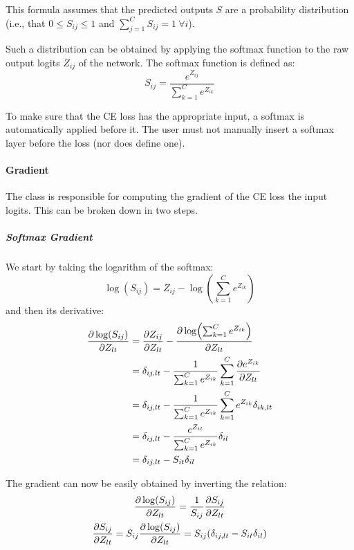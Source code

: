 This formula assumes that the predicted outputs $S$ are a probability distribution (i.e., that $0 \leq S_{ij} \leq 1$ and $\sum_{j=1}^{C} S_{ij} = 1\ \forall i$).

Such a distribution can be obtained by applying the softmax function to the raw output logits $Z_{ij}$ of the network. The softmax function is defined as:
\begin{equation}
    S_{ij} = \frac{e^{Z_{ij}}}{\sum_{k=1}^{C} e^{Z_{ik}}}
\end{equation}

To make sure that the \ac{CE} loss has the appropriate input, a softmax is automatically applied before it. The user must not manually insert a softmax layer before the loss (nor does \mfnet define one).

\paragraph{Gradient} The  class is responsible for computing the gradient of the \ac{CE} loss \wrt the input logits. This can be broken down in two steps.

\subparagraph{Softmax Gradient} We start by taking the logarithm of the softmax:
\begin{equation}
    \log(S_{ij}) = Z_{ij} - \log(\sum_{k=1}^{C} e^{Z_{ik}})
\end{equation}
and then its derivative:
\begin{equation} \label{eq:softmax_grad}
\begin{split}
    \pdv{\log(S_{ij})}{Z_{lt}} &= \pdv{Z_{ij}}{Z_{lt}} - \pdv{\log(\sum_{k=1}^{C} e^{Z_{ik}})}{Z_{lt}}\\
    &= \delta_{ij,lt} - \frac{1}{\sum_{k=1}^{C} e^{Z_{ik}}} \sum_{k=1}^{C} \pdv{e^{Z_{ik}}}{Z_{lt}}\\
    &= \delta_{ij,lt} - \frac{1}{\sum_{k=1}^{C} e^{Z_{ik}}} \sum_{k=1}^{C} e^{Z_{ik}} \delta_{ik,lt}\\
    &= \delta_{ij,lt} - \frac{e^{Z_{it}}}{\sum_{k=1}^{C} e^{Z_{ik}}} \delta_{il}\\
    &= \delta_{ij,lt} - S_{it} \delta_{il}
\end{split}
\end{equation}

The gradient can now be easily obtained by inverting the relation:
\begin{gather}
    \pdv{\log(S_{ij})}{Z_{lt}} = \frac{1}{S_{ij}} \pdv{S_{ij}}{Z_{lt}}\nonumber\\
    \pdv{S_{ij}}{Z_{lt}} = S_{ij} \pdv{\log(S_{ij})}{Z_{lt}} = S_{ij} (\delta_{ij,lt} - S_{it} \delta_{il})
\end{gather}

